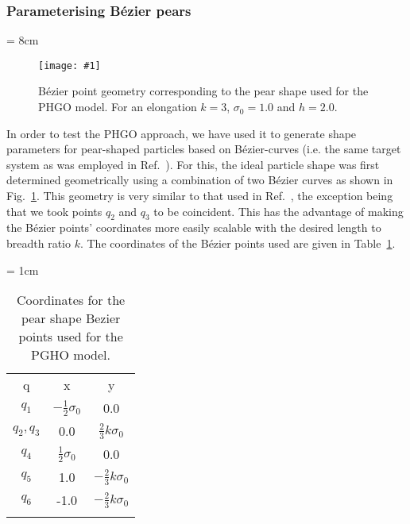 \documentclass[%
reprint,
superscriptaddress,
showpacs,
 amsmath,amssymb,
 aps,
floatfix,
]{revtex4-1}
\newcommand{\TAB}{\hspace*{\tabul}}
\newcommand{\picL}[1]{\texttt{[image: \#1]}}
\newlength{\picW}
\newlength{\tabul}
\begin{document}
\subsubsection{Parameterising B\'{e}zier pears}

\picW = 8cm
\begin{figure}
    \centering
    \picL{k3_GBP.ps}
    \caption{B\'ezier point geometry corresponding to the pear shape used for the PHGO model.
    For an elongation $k=3$, $\sigma_0 = 1.0$ and $h=2.0$.}
    \label{fig:bezierPear_k3}
\end{figure}


In order to test the PHGO approach, we have used it to generate shape parameters for
pear-shaped particles based on B\'{e}zier-curves (i.e. the same target system as was employed in
Ref.~\cite{Berardi_Ricci_01}). For this, the ideal particle shape was first determined
geometrically using a combination of two B\'{e}zier curves as shown in
Fig.~\ref{fig:bezierPear_k3}. This geometry is very similar to that used in
Ref.~\cite{Berardi_Ricci_01}, the exception being that we took points $q_2$ and $q_3$ to be
coincident. This has the advantage of making the B\'{e}zier points' coordinates more easily
scalable with the desired length to breadth ratio $k$. The coordinates of the B\'{e}zier points
used are given in Table~\ref{tble:bezierCoords}.

\tabul = 1cm
\begin{table}
    \centering
    \begin{tabular}{ccc}
    \hhline{===}
    \TAB q\TAB  &\TAB x\TAB &\TAB y\TAB             \\
    \hhline{---}
    $q_1$          &$-\frac{1}{2}\sigma_0$   &0.0                    \\
    $q_2,$$q_3$    &0.0                      &$\frac{2}{3}k\sigma_0$  \\
    $q_4$          &$\frac{1}{2}\sigma_0$    &0.0                    \\
    $q_5$          &1.0                      &$-\frac{2}{3}k\sigma_0$ \\
    $q_6$          &-1.0                     &$-\frac{2}{3}k\sigma_0$ \\
    \hhline{===}
    \end{tabular}
    \caption{Coordinates for the pear shape Bezier points used for the PGHO model.}
    \label{tble:bezierCoords}
\end{table}
\end{document}

